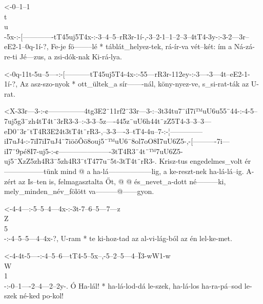   {<-0--1--1\\t\\u\\-5x-:-[-------------tT45uj5T4x-:-3--4--5--rR3r-1í-,-3--2-1--1--2--3--4tT4-3y-:-3-2---3r--eE2-1--0q-1í-?,}
  {  Fe-je fö--------lé * táblát_helyez-tek,         rá-ír-va vét--két: ím a Ná-zá-re-ti Jé---zus, a zsi-dók-nak Ki-rá-lya.}



  {<-0q-11t-5u--5----:-[-----------tT45uj5T4-4x-:-55---rR3r-112ey-:-3----3---4t--eE2-1-1í-?,}
  {  Az asz-szo-nyok * ott_ültek_a sír-------nál, köny-nyez-ve,     s_si-rat-ták az  U-rat.}

  {<X-33r---3-:-¢---------------4tg3E2¨11rf2¨33r---3-:--3t34tu7¨iI7i™uU6u55¨44-:-4-5--7uj5g3¨zh4tT4t¨3rR3-3--:-3-3--5z----445z¨uU6h44t¨zZ5T4-3--3--3---eD0¨3r¨tT4R3E24t3tT4t¨rR3-,--3-3----3--tT4-4u--7-:-¦--------------iI7uJ4-:-7iI7iI7uJ4¨7iöõÕö8ouj5¨™uU6¨8ol7oO8I7uU6Z5-,-[----------7i---iI7¨9pé8I7-uj5-:-¢----------------------3tT4R3¨4t¨™7uU6Z5-uj5¨XzZ5zh4R3¨5zh4R3¨tT477u¨5t-3tT4t¨rR3-.}
  {   Krisz-tus engedelmes_volt ér-----------------tünk mind         @           a ha-lá------------------lig, a ke-reszt-nek                ha-lá-lá--ig.                          A-zért az Is--ten is, felmagasztalta Őt,      @           @                                és_nevet_a-dott né---------ki,   mely_minden_név_fölött va---------@------gyon.}


  {<-4-4---:-5--5--4---4x-:-3t-7--6--5---7---z\\Z\\5\\-:-4--5--5---4--4x-?,}
  {  U-ram * te ki-hoz-tad  az al-vi-lág-ból             az én lel-ke-met.}


  {<-4-4t-5----:-4--5--6---tT4-5--5x--,-5--2--5---4--Ï3-wW1-w\\W\\1\\-:-0--1----2--4---2--2y-.}
  {  Ó Ha-lál! * ha-lá-lod-dá  le-szek, ha-lá-los ha-ra-pá--sod         le-szek né-ked po-kol!}

